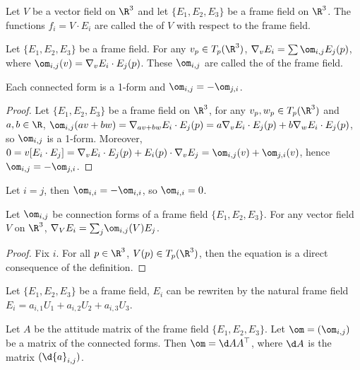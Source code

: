 \documentclass[10pt]{article}
\begin{document}
\begin{definition}
    Let $V$ be a vector field on ${\R}^{3}$ and let $\{{E}_{1},{E}_{2},{E}_{3}\}$ be a frame field on ${\R}^{3}$. The functions ${f}_{i}=V\cdot{E}_{i}$ are called the  of $V$ with respect to the frame field.
\end{definition}
\begin{definition}
    Let $\{{E}_{1},{E}_{2},{E}_{3}\}$ be a frame field. For any ${v}_{p}\in{T}_{p}({\R}^{3})$, ${\nabla}_{v}{E}_{i}=\sum{\om}_{i,j}{E}_{j}(p)$, where ${\om}_{i,j}(v)={\nabla}_{v}{E}_{i}\cdot{E}_{j}(p)$. These ${\om}_{i,j}$ are called the  of the frame field.
\end{definition}
\begin{proposition}
    Each connected form is a 1-form and ${\om}_{i,j}=-{\om}_{j,i}$.
\end{proposition}
\begin{proof}
    Let $\{{E}_{1},{E}_{2},{E}_{3}\}$ be a frame field on ${\R}^{3}$, for any ${v}_{p},{w}_{p}\in{T}_{p}({\R}^{3})$ and $a,b\in\R$, ${\om}_{i,j}(av+bw)={\nabla}_{av+bw}{E}_{i}\cdot{E}_{j}(p)=a{\nabla}_{v}{E}_{i}\cdot{E}_{j}(p)+b{\nabla}_{w}{E}_{i}\cdot{E}_{j}(p)$, so ${\om}_{i,j}$ is a 1-form. Moreover, $0=v[{E}_{i}\cdot{E}_{j}]={\nabla}_{v}{E}_{i}\cdot{E}_{j}(p)+{E}_{i}(p)\cdot{\nabla}_{v}{E}_{j}={\om}_{i,j}(v)+{\om}_{j,i}(v)$, hence ${\om}_{i,j}=-{\om}_{j,i}$.
\end{proof}
\par
Let $i=j$, then ${\om}_{i,i}=-{\om}_{i,i}$, so ${\om}_{i,i}=0$.
\begin{proposition}
    Let ${\om}_{i,j}$ be connection forms of a frame field $\{{E}_{1},{E}_{2},{E}_{3}\}$. For any vector field $V$ on ${\R}^{3}$, ${\nabla}_{V}{E}_{i}={\sum}_{j}{\om}_{i,j}(V){E}_{j}$.
\end{proposition}
\begin{proof}
    Fix $i$. For all $p\in{\R}^{3}$, $V(p)\in{T}_{p}({\R}^{3})$, then the equation is a direct consequence of the definition.
\end{proof}
\par
Let $\{{E}_{1},{E}_{2},{E}_{3}\}$ be a frame field, ${E}_{i}$ can be rewriten by the natural frame field ${E}_{i}={a}_{i,1}{U}_{1}+{a}_{i,2}{U}_{2}+{a}_{i,3}{U}_{3}$.
\begin{proposition}
    Let $A$ be the attitude matrix of the frame field $\{{E}_{1},{E}_{2},{E}_{3}\}$. Let $\om=({\om}_{i,j})$ be a matrix of the connected forms. Then $\om=\d A{A}^{\top}$, where $\d A$ is the matrix $(\d{a}_{i,j})$.
\end{proposition}
\end{document}

